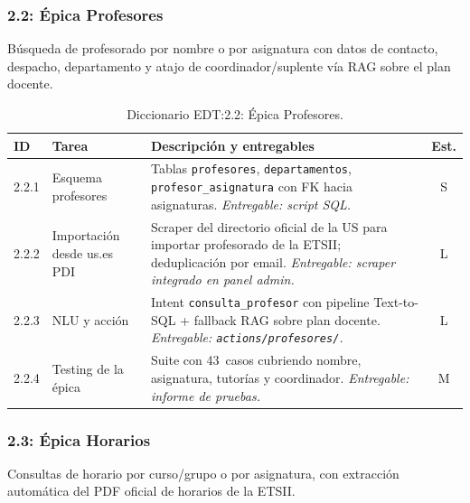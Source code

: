 \subsubsection{2.2: Épica Profesores}\label{subsubsec:epica-prof}

Búsqueda de profesorado por nombre o por asignatura con datos de contacto, despacho, departamento y atajo de coordinador/suplente vía RAG sobre el plan docente.

\begin{table}[hbtp]
\centering
\small
\begin{tabular}{|l|l|p{7.5cm}|c|}
\hline
\textbf{ID} & \textbf{Tarea} & \textbf{Descripción y entregables} & \textbf{Est.} \\ \hline
2.2.1 & Esquema profesores & Tablas \texttt{profesores}, \texttt{departamentos}, \texttt{profesor\_asignatura} con FK hacia asignaturas. \textit{Entregable: script SQL.} & S \\ \hline
2.2.2 & Importación desde us.es PDI & Scraper del directorio oficial de la US para importar profesorado de la ETSII; deduplicación por email. \textit{Entregable: scraper integrado en panel admin.} & L \\ \hline
2.2.3 & NLU y acción & Intent \texttt{consulta\_profesor} con pipeline Text-to-SQL + fallback RAG sobre plan docente. \textit{Entregable: \texttt{actions/profesores/}.} & L \\ \hline
2.2.4 & Testing de la épica & Suite con 43~casos cubriendo nombre, asignatura, tutorías y coordinador. \textit{Entregable: informe de pruebas.} & M \\ \hline
\end{tabular}
\caption{Diccionario EDT:2.2: Épica Profesores.}
\label{tab:dict-2-2}
\end{table}

\subsubsection{2.3: Épica Horarios}\label{subsubsec:epica-hor}

Consultas de horario por curso/grupo o por asignatura, con extracción automática del PDF oficial de horarios de la ETSII.

